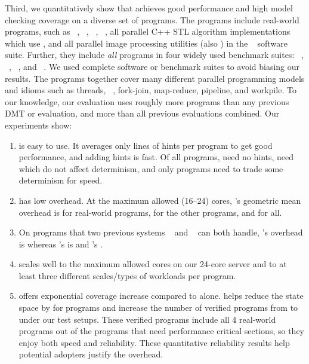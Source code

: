 Third, we quantitatively show that \parrot achieves good performance and high
model checking coverage on a diverse set of \nprog programs.  The programs
include \nrealprog real-world programs, such as \bdb~\cite{berkeleydb},
\openldap~\cite{openldap}, \redis~\cite{redis}, \mplayer~\cite{mplayer},
all \nstl parallel C++ STL algorithm 
implementations~\cite{parallel-stl} which use \openmp, and all \nimagick
parallel image processing utilities (also \openmp) in the
\imagick~\cite{imagick}
software suite.  Further, they
include \emph{all} \nbenchmarks programs in four widely used benchmark suites:
\parsec~\cite{parsec}, \phoenix~\cite{phoenix-benchmarks},
\splashx~\cite{splashx},
and \npb~\cite{npb}.  We used complete software or benchmark suites to
avoid biasing our results. The programs together cover many different
parallel programming models and idioms such as threads,
\openmp~\cite{openmp}, fork-join, map-reduce, pipeline, and workpile.  To
our knowledge, our
evaluation uses roughly \overeach more programs than any previous
DMT or \smt evaluation, and \overcombined more than all
previous evaluations combined.
Our experiments show:
\begin{enumerate}

\item \parrot is easy to use. It averages only \hintsperprog lines of hints
  per program to get good performance, and adding hints is fast.  Of all
  \nprog programs, \nprognohints need no hints, \nproglineuphints need
  \computes which do not affect determinism, and only \nprognondethints
  programs need \nondets to trade some determinism for speed.

\item \parrot has low overhead.  At the maximum allowed (16--24) cores,
\parrot's
  geometric mean overhead is \meanrealoverhead for \nrealprog real-world
programs,
  \meanbenchoverhead for the other \nbenchmarks programs, and \meanoverhead for
all.

\item On \nprogcompared programs that two previous systems
\dthreads~\cite{dthreads:sosp11}
  and \coredet~\cite{coredet:asplos10} can both handle, \parrot's overhead is
\parrotcompoverhead whereas \dthreads's
  is \dthreadssyncoverhead and \coredet's \coredetoverhead.

\item \parrot scales well to the maximum allowed cores on our 24-core server and
  to at least three different scales/types of workloads per program.

\item \ecosys offers exponential coverage increase compared to \dbug alone.
  \parrot helps \dbug reduce the state space by \shrinkscale for
  \nprogshrink programs and increase the number of verified programs from
  \nprogverifieddbug to \nprogverifiedxxx under our test setups.
  These verified programs include all 4 real-world programs out of
  the \nprognondethints programs that need performance critical sections, so
they
  enjoy both speed and reliability.
  These quantitative reliability results help potential \parrot adopters justify
  the overhead.

\end{enumerate}

